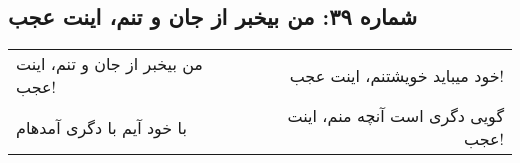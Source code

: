 \begin{center}
\section*{شماره ۳۹: من بیخبر از جان و تنم، اینت عجب}
\label{sec:039}
\begin{longtable}{l p{0.5cm} r}
من بیخبر از جان و تنم، اینت عجب!
&&
خود میباید خویشتنم، اینت عجب!
\\
با خود آیم با دگری آمدهام
&&
گویی دگری است آنچه منم، اینت عجب!
\\
\end{longtable}
\end{center}
